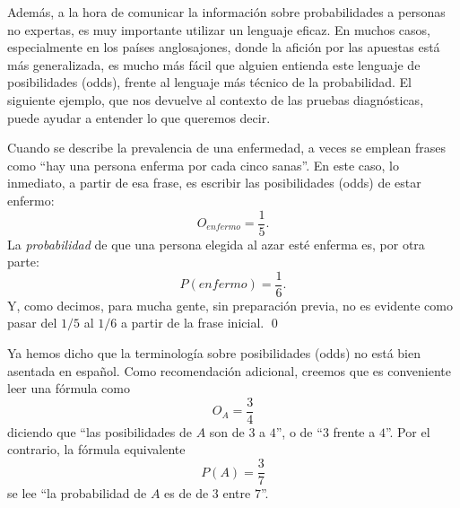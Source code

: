 Además, a la hora de comunicar la información sobre probabilidades a personas no expertas, es muy importante utilizar un lenguaje eficaz. En muchos casos, especialmente en los países anglosajones, donde la afición por las apuestas está más generalizada, es mucho más fácil que alguien entienda este lenguaje de posibilidades (odds), frente al lenguaje más técnico de la probabilidad. El siguiente ejemplo, que nos devuelve al contexto de las pruebas diagnósticas, puede ayudar a entender lo que queremos decir.
\begin{ejemplo}\label{cap03:ejem:SignificadoIntuitivoOddsPruebasDiagnosticas}
Cuando se describe la prevalencia de una enfermedad, a veces se emplean frases como ``hay una persona enferma por cada cinco sanas''. En este caso, lo inmediato, a partir de esa frase, es escribir las  posibilidades (odds) de estar enfermo:
\[O_{enfermo}=\dfrac{1}{5}.\]
La {\em probabilidad} de que una persona elegida al azar esté enferma es, por otra parte:
\[P(enfermo)=\dfrac{1}{6}.\]
Y, como decimos, para mucha gente, sin preparación previa, no es evidente como pasar del $1/5$ al $1/6$ a partir de la frase inicial.
\qed
\end{ejemplo}
Ya hemos dicho que la terminología sobre posibilidades (odds) no está bien asentada en español. Como recomendación adicional, creemos que es conveniente leer una fórmula como
\[O_A=\dfrac{3}{4}\]
diciendo que ``las posibilidades de $A$ son de $3$ a $4$'', o de ``$3$ frente a $4$''. Por el contrario, la fórmula equivalente
\[P(A)=\dfrac{3}{7}\]
se lee ``la probabilidad de $A$ es de de $3$ entre $7$''.


